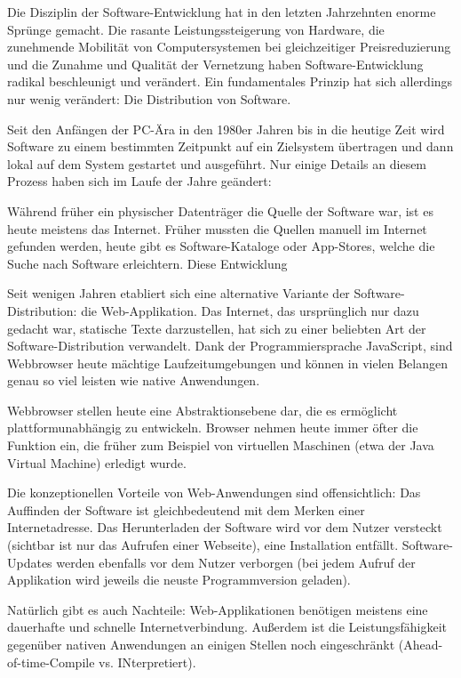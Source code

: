 Die Disziplin der Software-Entwicklung hat in den letzten Jahrzehnten enorme Sprünge gemacht. Die rasante Leistungssteigerung von Hardware, die zunehmende Mobilität von Computersystemen bei gleichzeitiger Preisreduzierung und die Zunahme und Qualität der Vernetzung haben Software-Entwicklung radikal beschleunigt und verändert. Ein fundamentales Prinzip hat sich allerdings nur wenig verändert: Die Distribution von Software.

Seit den Anfängen der PC-Ära in den 1980er Jahren bis in die heutige Zeit wird Software zu einem bestimmten Zeitpunkt auf ein Zielsystem übertragen und dann lokal auf dem System gestartet und ausgeführt. Nur einige Details an diesem Prozess haben sich im Laufe der Jahre geändert:

Während früher ein physischer Datenträger die Quelle der Software war, ist es heute meistens das Internet. Früher mussten die Quellen manuell im Internet gefunden werden, heute gibt es Software-Kataloge oder App-Stores, welche die Suche nach Software erleichtern. Diese Entwicklung 

Seit wenigen Jahren etabliert sich eine alternative Variante der Software-Distribution: die Web-Applikation. Das Internet, das ursprünglich nur dazu gedacht war, statische Texte darzustellen, hat sich zu einer beliebten Art der Software-Distribution verwandelt. Dank der Programmiersprache JavaScript, sind Webbrowser heute mächtige Laufzeitumgebungen und können in vielen Belangen genau so viel leisten wie native Anwendungen.

Webbrowser stellen heute eine Abstraktionsebene dar, die es ermöglicht plattformunabhängig zu entwickeln. Browser nehmen heute immer öfter die Funktion ein, die früher zum Beispiel von virtuellen Maschinen (etwa der Java Virtual Machine) erledigt wurde.

Die konzeptionellen Vorteile von Web-Anwendungen sind offensichtlich: Das Auffinden der Software ist gleichbedeutend mit dem Merken einer Internetadresse. Das Herunterladen der Software wird vor dem Nutzer versteckt (sichtbar ist nur das Aufrufen einer Webseite), eine Installation entfällt. Software-Updates werden ebenfalls vor dem Nutzer verborgen (bei jedem Aufruf der Applikation wird jeweils die neuste Programmversion geladen).

Natürlich gibt es auch Nachteile: Web-Applikationen benötigen meistens eine dauerhafte und schnelle Internetverbindung. Außerdem ist die Leistungsfähigkeit gegenüber nativen Anwendungen an einigen Stellen noch eingeschränkt (Ahead-of-time-Compile vs. INterpretiert).

